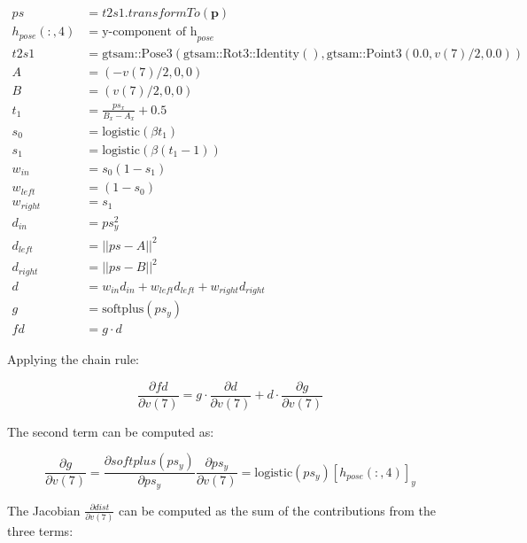 \documentclass[11pt]{article}
\begin{document}
            \begin{align}
                ps &= t2s1.transformTo(\mathbf{p}) \\
                h_{pose}(:,4) &= \text{y-component of h}_{pose} \\
                t2s1 &= \text{gtsam::Pose3}(\text{gtsam::Rot3::Identity}(), \text{gtsam::Point3}(0.0, v(7)/2, 0.0)) \\
                A &= (-v(7)/2, 0, 0) \\
                B &= (v(7)/2, 0, 0) \\
                t_1 &= \frac{ps_{x}}{B_x - A_x} + 0.5 \\
                s_0 &= \text{logistic}(\beta t_1) \\
                s_1 &= \text{logistic}(\beta (t_1 - 1)) \\
                w_{in} &= s_0 (1 - s_1) \\
                w_{left} &= (1 - s_0) \\
                w_{right} &= s_1 \\
                d_{in} &= ps_{y}^2 \\
                d_{left} &= ||ps - A||^2 \\
                d_{right} &= ||ps - B||^2 \\
                d &= w_{in} d_{in} + w_{left} d_{left} + w_{right} d_{right} \\
                g &= \text{softplus}(ps_{y}) \\
                fd &= g \cdot d
            \end{align}

            Applying the chain rule:

            \begin{equation}
                \frac{\partial fd}{\partial v(7)} = g \cdot \frac{\partial d}{\partial v(7)} + d \cdot \frac{\partial g}{\partial v(7)}
            \end{equation}

            The second term can be computed as:

            \begin{equation}
                \frac{\partial g}{\partial v(7)} =  \frac{\partial softplus(ps_y)}{\partial ps_y} \frac{\partial ps_y}{\partial v(7)} = \text{logistic}(ps_y) [h_{pose}(:,4)]_y
            \end{equation}

            The Jacobian $\frac{\partial dist}{\partial v(7)}$ can be computed as the sum of the contributions from the three terms:
\end{document}

